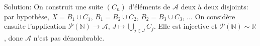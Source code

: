 \documentclass{report}
\begin{document}
Solution: On construit une suite $(C_n)$ d'éléments de $\mathcal A$ deux à deux disjoints: par hypothèse, $X = B_1\cup C_1$, $B_1=B_2\cup C_2$, $B_2=B_3\cup C_3$, ... On considère ensuite l'application $\mathcal P( \mathbb N) \to \mathcal A$, $J \mapsto \bigcup_{j\in J} C_j$. Elle est injective et $\mathcal P( \mathbb N) \sim \mathbb R$, donc $\mathcal A$ n'est pas dénombrable.

\subsection{} 

\subsection{}  \\
\end{document}
